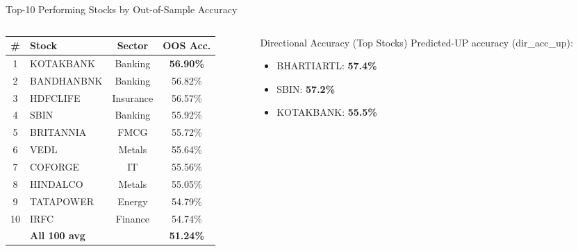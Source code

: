 \documentclass[aspectratio=43,11pt]{beamer}
\begin{document}
\begin{frame}[shrink=3]{Top-10 Performing Stocks by Out-of-Sample Accuracy}
    \begin{columns}[T]
        \begin{column}{0.52\textwidth}
            \begin{center}
            \footnotesize
            \begin{tabular}{clcc}
                \toprule
                \textbf{\#} & \textbf{Stock} & \textbf{Sector} & \textbf{OOS Acc.} \\
                \midrule
                \rowcolor{successgreen!30}
                1  & KOTAKBANK  & Banking   & \textbf{56.90\%} \\
                \rowcolor{successgreen!20}
                2  & BANDHANBNK & Banking   & 56.82\% \\
                3  & HDFCLIFE   & Insurance & 56.57\% \\
                4  & SBIN       & Banking   & 55.92\% \\
                5  & BRITANNIA  & FMCG      & 55.72\% \\
                6  & VEDL       & Metals    & 55.64\% \\
                7  & COFORGE    & IT        & 55.56\% \\
                8  & HINDALCO   & Metals    & 55.05\% \\
                9  & TATAPOWER  & Energy    & 54.79\% \\
                10 & IRFC       & Finance   & 54.74\% \\
                \midrule
                   & \textbf{All 100 avg} & & \textbf{51.24\%} \\
                \bottomrule
            \end{tabular}
            \end{center}
        \end{column}
        \begin{column}{0.44\textwidth}
            \begin{block}{Directional Accuracy (Top Stocks)}
                \footnotesize
                Predicted-UP accuracy (dir\_acc\_up):
                \begin{itemize}\setlength{\itemsep}{1pt}
                    \item BHARTIARTL: \textbf{57.4\%}
                    \item SBIN: \textbf{57.2\%}
                    \item KOTAKBANK: \textbf{55.5\%}

\end{itemize}
\end{block}
\end{column}
\end{columns}
\end{frame}
\end{document}

